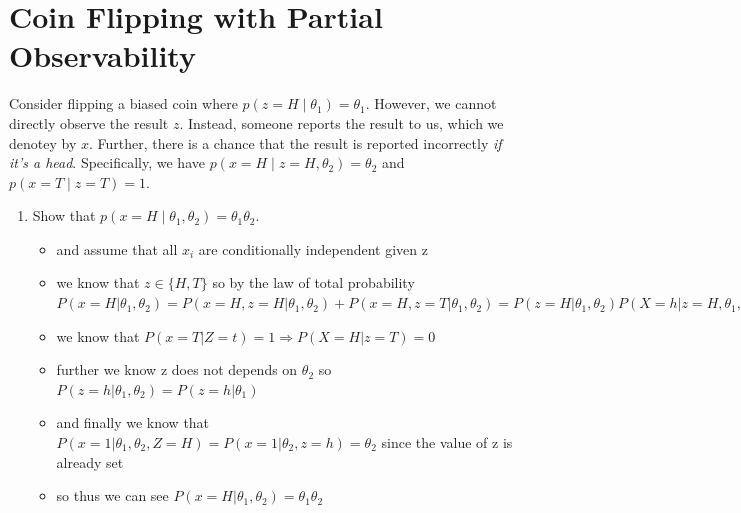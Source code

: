 \documentclass{article}
\theoremstyle{plain}
\theoremstyle{definition}
\begin{document}
\section{Coin Flipping with Partial Observability}
Consider flipping a biased coin where $p(z=H\mid \theta_1) = \theta_1$.
However, we cannot directly observe the result $z$.
Instead, someone reports the result to us,
which we denotey by $x$.
Further, there is a chance that the result is reported incorrectly \emph{if it's a head}.
Specifically, we have $p(x=H\mid z=H, \theta_2) = \theta_2$
and $p(x=T\mid z=T) = 1$.

\begin{enumerate}
  \setcounter{enumi}{\value{saveenum}}
\item Show that $p(x=H\mid \theta_1, \theta_2) = \theta_1 \theta_2$.
\begin{itemize}
    \color{blue}
    \item and assume that all $x_i$ are conditionally independent given z 
    \item we know that $z\in \{H,T\}$ so by the law of total probability $P(x=H|\theta_1,\theta_2)=P(x=H,z=H|\theta_1, \theta_2)+P(x=H,z=T|\theta_1, \theta_2)=P(z=H|\theta_1, \theta_2)P(X=h|z=H, \theta_1, \theta_2)+P(z=T|\theta_1, \theta_2)P(x=H|z=t,\theta_1, \theta_2)$
    \item we know that $P(x=T|Z=t)=1\Rightarrow P(X=H|z=T)=0$
    \item further we know z does not depends on $\theta_2$ so $P(z=h|\theta_1,\theta_2)=P(z=h|\theta_1)$
    \item and finally we know that $P(x=1|\theta_1, \theta_2, Z=H)=P(x=1|\theta_2, z=h)=\theta_2$ since the value of z is already set
    \item so thus we can see $ P(x=H|\theta_1,\theta_2)=\theta_1\theta_2$
\end{itemize}


\end{enumerate}
\end{document}
